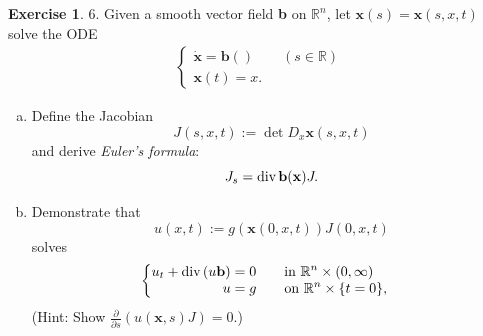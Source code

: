 \message{ !name(PDE-hw6-21935004-\unexpanded{谭焱}.tex)}\documentclass[a4paper]{book}
\numberwithin{equation}{chapter}
\theoremstyle{definition}
\newtheorem{exc}[exm]{Exercise}
\begin{document}
\begin{exc}
  6.  Given a smooth vector field \textbf{b} on $\mathbb{R}^n$, let $\mathbf{x}(s) = \mathbf{x}(s,x,t)$ solve the ODE
  \begin{eqnarray} \nonumber
    \begin{cases}
      \dot{\mathbf{x}} = \mathbf{b}() \qquad (s \in \mathbb{R}) \\
      \mathbf{x}(t) = x.
    \end{cases}
  \end{eqnarray}
  \begin{enumerate}[(a)]
  \item Define the Jacobian
    \begin{equation}
      \label{eq:6:5:1}
      J(s,x,t) := \det D_x\mathbf{x}(s,x,t)
    \end{equation}
    and derive \textit{Euler's formula}:
    \begin{equation}
      \label{eq:6:5:2}
      J_s = \textmd{div}\, \mathbf{b(x)}J.
    \end{equation}

  \item Demonstrate that
    \begin{equation}
      \label{eq:6:5:3}
      u(x,t) := g(\mathbf{x}(0,x,t))J(0,x,t)
    \end{equation}
    solves
    \begin{eqnarray}
      \label{eq:6:5:4}
      \begin{cases}
        \begin{aligned}
        u_t + \textmd{div}\,(u\mathbf{b}) &= 0 \qquad \textmd{in } \mathbb{R}^n \times (0,\infty) \\
        u &= g \qquad \textmd{on } \mathbb{R}^n \times \{t = 0\},
        \end{aligned}
      \end{cases}
    \end{eqnarray}
    (Hint: Show $\frac{\partial}{\partial s}(u(\mathbf{x},s)J) = 0$.)
  \end{enumerate}
\end{exc}
\end{document}
